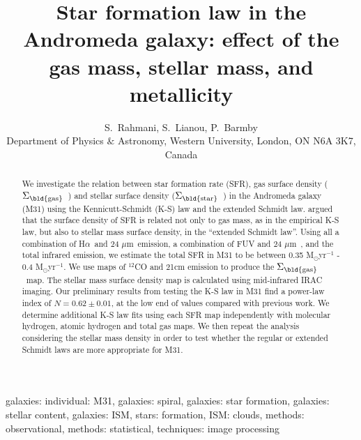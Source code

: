 \documentclass[useAMS,usenatbib]{mn2e}
\newcommand \sigmagas    {$\Sigma_{\rm \bld {gas }} $\ }
\newcommand \sigmastar    {$\Sigma_{\rm \bld {star }} $\ }
\newcommand \halpha    {H$\alpha $\ }
\newcommand \um    {$\mu$m\ }
\begin{document}
\title[STAR FORMATION LAW IN M31]{Star formation law in the Andromeda galaxy: effect of the gas mass, stellar mass, and metallicity }
\author[S. Rahmani, et. al.]{S.~Rahmani, S.~Lianou, P.~Barmby\\
Department of Physics $\&$ Astronomy, Western University, London, ON N6A 3K7, Canada}
\maketitle

\begin{abstract} %
 We investigate the relation between star formation rate (SFR), gas surface density (\sigmagas) and stellar surface density (\sigmastar) in the Andromeda galaxy (M31) using the Kennicutt-Schmidt (K-S) law and the extended Schmidt law. \cite{Shi11} argued that the surface density of SFR is related not only to gas mass, as in the empirical K-S law,  but also to stellar mass surface density, in the ``extended Schmidt law''. Using all a combination of \halpha and 24 \um emission, a combination of FUV and 24 \um, and the total infrared emission, we estimate the total SFR in M31 to be between 0.35 M$_{\odot}$yr$^{-1}$ - 0.4 M$_{\odot}$yr$^{-1}$. We use maps of $^{12}$CO and 21cm emission to produce the \sigmagas map.%
 The stellar mass surface density  map is calculated using mid-infrared IRAC imaging. Our preliminary results from testing the K-S law in M31 find a power-law index of  $N = 0.62 \pm 0.01$, at the low end of values compared with previous work. We determine additional K-S law fits using each SFR map independently with molecular hydrogen, atomic hydrogen and total gas maps. We then repeat the analysis considering the stellar mass density in order to test whether the regular or extended Schmidt laws are more appropriate for M31.

\end{abstract}

\begin{keywords} 
galaxies: individual: M31, galaxies: spiral, galaxies: star formation, galaxies: stellar content, galaxies: ISM, stars: formation, ISM: clouds, methods: observational, methods: statistical, techniques: image processing 
\end{keywords}
\end{document}
